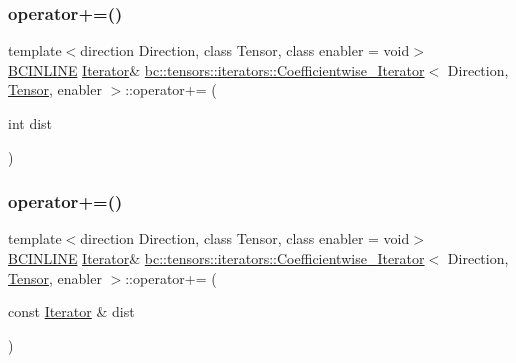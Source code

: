 \subsubsection{\texorpdfstring{operator+=()}{operator+=()}\hspace{0.1cm}{\footnotesize\ttfamily [1/2]}}
{\footnotesize\ttfamily template$<$direction Direction, class Tensor, class enabler = void$>$ \\
\hyperlink{common_8h_a6699e8b0449da5c0fafb878e59c1d4b1}{B\+C\+I\+N\+L\+I\+NE} \hyperlink{structbc_1_1tensors_1_1iterators_1_1Coefficientwise__Iterator_a313f76f47e60a806035279a36a84f835}{Iterator}\& \hyperlink{structbc_1_1tensors_1_1iterators_1_1Coefficientwise__Iterator}{bc\+::tensors\+::iterators\+::\+Coefficientwise\+\_\+\+Iterator}$<$ Direction, \hyperlink{namespacebc_a659391e47ab612be3ba6c18cf9c89159}{Tensor}, enabler $>$\+::operator+= (\begin{DoxyParamCaption}\item[{int}]{dist }\end{DoxyParamCaption})\hspace{0.3cm}{\ttfamily [inline]}}

\mbox{\label{structbc_1_1tensors_1_1iterators_1_1Coefficientwise__Iterator_a5f12767577562cbd019996c695a60b22}} 
\subsubsection{\texorpdfstring{operator+=()}{operator+=()}\hspace{0.1cm}{\footnotesize\ttfamily [2/2]}}
{\footnotesize\ttfamily template$<$direction Direction, class Tensor, class enabler = void$>$ \\
\hyperlink{common_8h_a6699e8b0449da5c0fafb878e59c1d4b1}{B\+C\+I\+N\+L\+I\+NE} \hyperlink{structbc_1_1tensors_1_1iterators_1_1Coefficientwise__Iterator_a313f76f47e60a806035279a36a84f835}{Iterator}\& \hyperlink{structbc_1_1tensors_1_1iterators_1_1Coefficientwise__Iterator}{bc\+::tensors\+::iterators\+::\+Coefficientwise\+\_\+\+Iterator}$<$ Direction, \hyperlink{namespacebc_a659391e47ab612be3ba6c18cf9c89159}{Tensor}, enabler $>$\+::operator+= (\begin{DoxyParamCaption}\item[{const \hyperlink{structbc_1_1tensors_1_1iterators_1_1Coefficientwise__Iterator_a313f76f47e60a806035279a36a84f835}{Iterator} \&}]{dist }\end{DoxyParamCaption})\hspace{0.3cm}{\ttfamily [inline]}}

